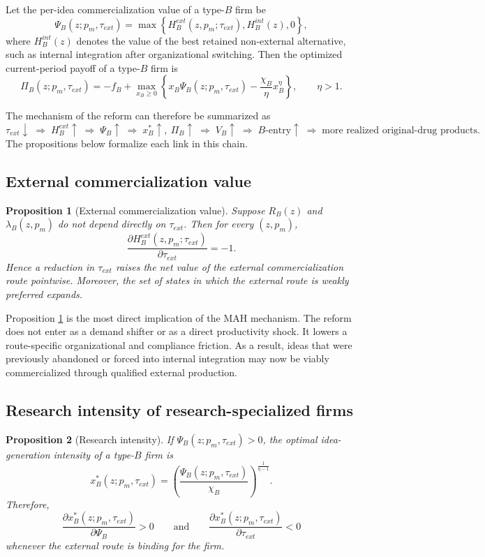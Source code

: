 \documentclass[12pt]{article}
\newtheorem{proposition}{Proposition}
\begin{document}
Let the per-idea commercialization value of a type-\(B\) firm be
\[
\Psi_B(z;p_m,\tau_{ext})
=
\max\left\{
H_B^{ext}(z,p_m;\tau_{ext}),
H_B^{int}(z),
0
\right\},
\]
where \(H_B^{int}(z)\) denotes the value of the best retained non-external alternative, such as internal integration after organizational switching. Then the optimized current-period payoff of a type-\(B\) firm is
\[
\Pi_B(z;p_m,\tau_{ext})
=
-f_B
+
\max_{x_B\ge 0}
\left\{
x_B\Psi_B(z;p_m,\tau_{ext})
-\frac{\chi_B}{\eta}x_B^\eta
\right\},
\qquad \eta>1.
\]

The mechanism of the reform can therefore be summarized as
\[
\tau_{ext}\downarrow
\;\Rightarrow\;
H_B^{ext}\uparrow
\;\Rightarrow\;
\Psi_B\uparrow
\;\Rightarrow\;
x_B^*\uparrow,\ \Pi_B\uparrow
\;\Rightarrow\;
V_B\uparrow
\;\Rightarrow\;
B\text{-entry}\uparrow
\;\Rightarrow\;
\text{more realized original-drug products.}
\]
The propositions below formalize each link in this chain.

\subsection{External commercialization value}

\begin{proposition}[External commercialization value]
\label{prop:ext_value}
Suppose \(R_B(z)\) and \(\lambda_B(z,p_m)\) do not depend directly on \(\tau_{ext}\). Then for every \((z,p_m)\),
\[
\frac{\partial H_B^{ext}(z,p_m;\tau_{ext})}{\partial \tau_{ext}}=-1.
\]
Hence a reduction in \(\tau_{ext}\) raises the net value of the external commercialization route pointwise. Moreover, the set of states in which the external route is weakly preferred expands.
\end{proposition}

\noindent
Proposition \ref{prop:ext_value} is the most direct implication of the MAH mechanism. The reform does not enter as a demand shifter or as a direct productivity shock. It lowers a route-specific organizational and compliance friction. As a result, ideas that were previously abandoned or forced into internal integration may now be viably commercialized through qualified external production.

\subsection{Research intensity of research-specialized firms}

\begin{proposition}[Research intensity]
\label{prop:xb}
If \(\Psi_B(z;p_m,\tau_{ext})>0\), the optimal idea-generation intensity of a type-\(B\) firm is
\[
x_B^*(z;p_m,\tau_{ext})
=
\left(
\frac{\Psi_B(z;p_m,\tau_{ext})}{\chi_B}
\right)^{\frac{1}{\eta-1}}.
\]
Therefore,
\[
\frac{\partial x_B^*(z;p_m,\tau_{ext})}{\partial \Psi_B}>0
\qquad\text{and}\qquad
\frac{\partial x_B^*(z;p_m,\tau_{ext})}{\partial \tau_{ext}}<0
\]
whenever the external route is binding for the firm.
\end{proposition}
\end{document}
